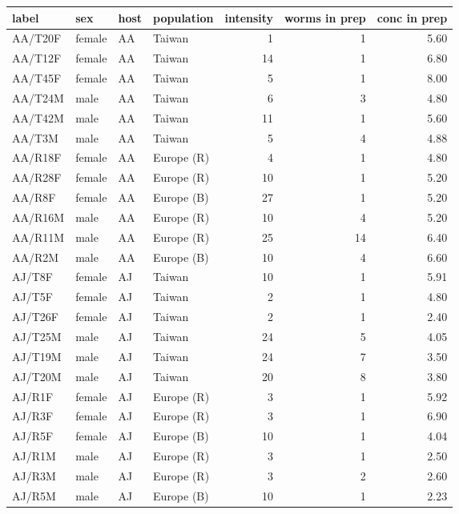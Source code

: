 \begin{table}[h]
\begin{center}
\begin{tabular}{llllrrr}
  \hline
label & sex & host & population & intensity & worms in prep & conc in prep \\ 
  \hline
AA/T20F & female & AA & Taiwan & 1 & 1 & 5.60 \\ 
  AA/T12F & female & AA & Taiwan & 14 & 1 & 6.80 \\ 
  AA/T45F & female & AA & Taiwan & 5 & 1 & 8.00 \\ 
  AA/T24M & male & AA & Taiwan & 6 & 3 & 4.80 \\ 
  AA/T42M & male & AA & Taiwan & 11 & 1 & 5.60 \\ 
  AA/T3M & male & AA & Taiwan & 5 & 4 & 4.88 \\ 
  AA/R18F & female & AA & Europe (R) & 4 & 1 & 4.80 \\ 
  AA/R28F & female & AA & Europe (R) & 10 & 1 & 5.20 \\ 
  AA/R8F & female & AA & Europe (B) & 27 & 1 & 5.20 \\ 
  AA/R16M & male & AA & Europe (R) & 10 & 4 & 5.20 \\ 
  AA/R11M & male & AA & Europe (R) & 25 & 14 & 6.40 \\ 
  AA/R2M & male & AA & Europe (B) & 10 & 4 & 6.60 \\ 
  AJ/T8F & female & AJ & Taiwan & 10 & 1 & 5.91 \\ 
  AJ/T5F & female & AJ & Taiwan & 2 & 1 & 4.80 \\ 
  AJ/T26F & female & AJ & Taiwan & 2 & 1 & 2.40 \\ 
  AJ/T25M & male & AJ & Taiwan & 24 & 5 & 4.05 \\ 
  AJ/T19M & male & AJ & Taiwan & 24 & 7 & 3.50 \\ 
  AJ/T20M & male & AJ & Taiwan & 20 & 8 & 3.80 \\ 
  AJ/R1F & female & AJ & Europe (R) & 3 & 1 & 5.92 \\ 
  AJ/R3F & female & AJ & Europe (R) & 3 & 1 & 6.90 \\ 
  AJ/R5F & female & AJ & Europe (B) & 10 & 1 & 4.04 \\ 
  AJ/R1M & male & AJ & Europe (R) & 3 & 1 & 2.50 \\ 
  AJ/R3M & male & AJ & Europe (R) & 3 & 2 & 2.60 \\ 
  AJ/R5M & male & AJ & Europe (B) & 10 & 1 & 2.23 \\ 

\end{tabular}
\end{center}
\end{table}
